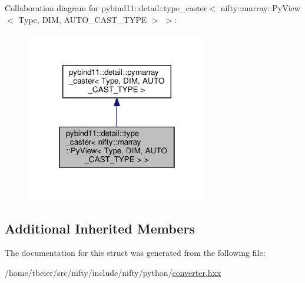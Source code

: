 Collaboration diagram for pybind11\+:\+:detail\+:\+:type\+\_\+caster$<$ nifty\+:\+:marray\+:\+:Py\+View$<$ Type, D\+I\+M, A\+U\+T\+O\+\_\+\+C\+A\+S\+T\+\_\+\+T\+Y\+P\+E $>$ $>$\+:\nopagebreak
\begin{figure}[H]
\begin{center}
\leavevmode
\includegraphics[width=226pt]{structpybind11_1_1detail_1_1type__caster_3_01nifty_1_1marray_1_1PyView_3_01Type_00_01DIM_00_01AU16b26df79ae2a442d9b79366b05a761c}
\end{center}
\end{figure}
\subsection*{Additional Inherited Members}


The documentation for this struct was generated from the following file\+:\begin{DoxyCompactItemize}
\item 
/home/tbeier/src/nifty/include/nifty/python/\hyperlink{converter_8hxx}{converter.\+hxx}\end{DoxyCompactItemize}
